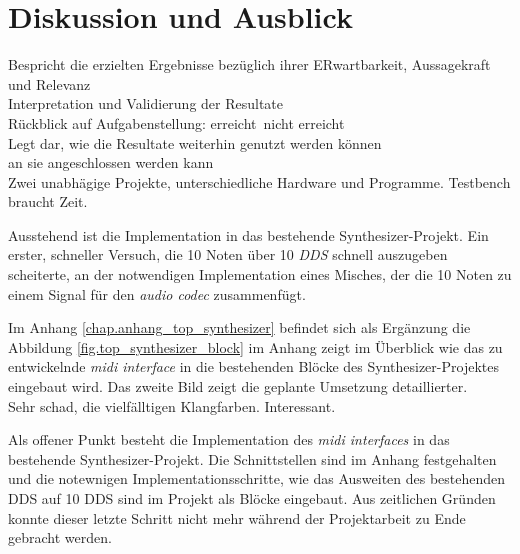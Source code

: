 
\chapter{Diskussion und Ausblick}\label{chap.diskussion}

Bespricht die erzielten Ergebnisse bezüglich ihrer ERwartbarkeit, Aussagekraft und Relevanz\\
Interpretation und Validierung der Resultate\\
Rückblick auf Aufgabenstellung: erreicht\ nicht erreicht\\

Legt dar, wie die Resultate weiterhin genutzt werden können\\ an sie angeschlossen werden kann\\


Zwei unabhägige Projekte, unterschiedliche Hardware und Programme. Testbench braucht Zeit.

Ausstehend ist die Implementation in das bestehende Synthesizer-Projekt. Ein erster, schneller Versuch, die 10 Noten über 10 \textit{DDS} schnell auszugeben scheiterte, an der notwendigen Implementation eines Misches, der die 10 Noten zu einem Signal für den \textit{audio codec} zusammenfügt. 

Im Anhang \ref{chap.anhang_top_synthesizer} befindet sich als Ergänzung die Abbildung \ref{fig.top_synthesizer_block} im Anhang  zeigt im Überblick wie das zu entwickelnde \textit{midi interface}  in die bestehenden Blöcke des Synthesizer-Projektes eingebaut wird. Das zweite Bild zeigt die geplante Umsetzung detaillierter.\\
Sehr schad, die vielfälltigen Klangfarben. Interessant. 






Als offener Punkt besteht die Implementation des \textit{midi interfaces} in das bestehende Synthesizer-Projekt. Die Schnittstellen sind im Anhang festgehalten und die notewnigen Implementationsschritte, wie das Ausweiten des bestehenden DDS auf 10 DDS sind im Projekt als Blöcke eingebaut. Aus zeitlichen Gründen konnte dieser letzte Schritt nicht mehr während der Projektarbeit zu Ende gebracht werden. 